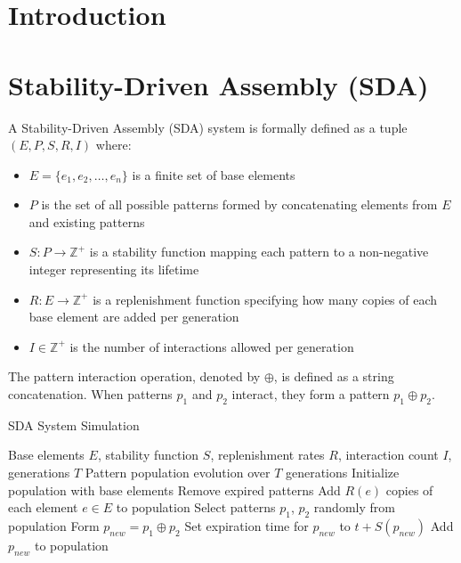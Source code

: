 \documentclass[life,article,submit,pdftex,moreauthors]{Definitions/mdpi}
\begin{document}
\section{Introduction}

\section{Stability-Driven Assembly (SDA)}

A Stability-Driven Assembly (SDA) \cite{adler_sda} system is formally defined as a tuple $(E, P, S, R, I)$ where:
\begin{itemize}
   \item $E = \{e_1, e_2, \ldots, e_n\}$ is a finite set of base elements
   \item $P$ is the set of all possible patterns formed by concatenating elements from $E$ and existing patterns
   \item $S: P \rightarrow \mathbb{Z}^{+}$ is a stability function mapping each pattern to a non-negative integer representing its lifetime
   \item $R: E \rightarrow \mathbb{Z}^{+}$ is a replenishment function specifying how many copies of each base element are added per generation
   \item $I \in \mathbb{Z}^{+}$ is the number of interactions allowed per generation
\end{itemize}

The pattern interaction operation, denoted by $\oplus$, is defined as a string concatenation. When patterns $p_1$ and $p_2$ interact, they form a pattern $p_1 \oplus p_2$.

\begin{algorithm}[H]
\caption{SDA System Simulation}
\footnotesize
\begin{algorithmic}[1]
\REQUIRE Base elements $E$, stability function $S$, replenishment rates $R$, interaction count $I$, generations $T$
\ENSURE Pattern population evolution over $T$ generations
\STATE Initialize population with base elements
   \STATE Remove expired patterns
   \STATE Add $R(e)$ copies of each element $e \in E$ to population
       \STATE Select patterns $p_1$, $p_2$ randomly from population
       \STATE Form $p_{new} = p_1 \oplus p_2$
       \STATE Set expiration time for $p_{new}$ to $t + S(p_{new})$
       \STATE Add $p_{new}$ to population
   \ENDFOR
\ENDFOR
\end{algorithmic}
\end{algorithm}
\end{document}
